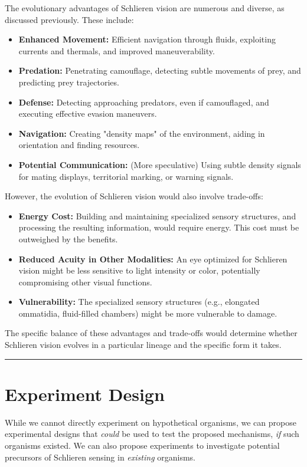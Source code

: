 \documentclass[11pt]{article}
\begin{document}
The evolutionary advantages of Schlieren vision are numerous and diverse, as discussed previously. These include:
\begin{itemize}
    \item \textbf{Enhanced Movement:} Efficient navigation through fluids, exploiting currents and thermals, and improved maneuverability.
    \item \textbf{Predation:} Penetrating camouflage, detecting subtle movements of prey, and predicting prey trajectories.
    \item \textbf{Defense:} Detecting approaching predators, even if camouflaged, and executing effective evasion maneuvers.
    \item \textbf{Navigation:} Creating "density maps" of the environment, aiding in orientation and finding resources.
    \item \textbf{Potential Communication:} (More speculative) Using subtle density signals for mating displays, territorial marking, or warning signals.
\end{itemize}
However, the evolution of Schlieren vision would also involve trade-offs:
\begin{itemize}
    \item \textbf{Energy Cost:} Building and maintaining specialized sensory structures, and processing the resulting information, would require energy. This cost must be outweighed by the benefits.
    \item \textbf{Reduced Acuity in Other Modalities:} An eye optimized for Schlieren vision might be less sensitive to light intensity or color, potentially compromising other visual functions.
    \item \textbf{Vulnerability:} The specialized sensory structures (e.g., elongated ommatidia, fluid-filled chambers) might be more vulnerable to damage.
\end{itemize}
The specific balance of these advantages and trade-offs would determine whether Schlieren vision evolves in a particular lineage and the specific form it takes.

\bigskip\noindent\rule{\linewidth}{0.4pt}\bigskip

\section{Experiment Design}

While we cannot directly experiment on hypothetical organisms, we can propose experimental designs that \textit{could} be used to test the proposed mechanisms, \textit{if} such organisms existed. We can also propose experiments to investigate potential precursors of Schlieren sensing in \textit{existing} organisms.
\end{document}
